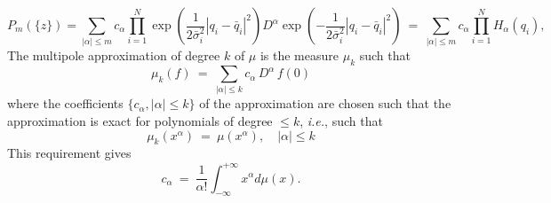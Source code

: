 \documentclass[11pt,a4paper]{article}
\begin{document}
\begin{equation}
    \label{eq:multipole-expansion-polynomial-II}
    P_m(\{{z}\})
    =
    \sum_{|\alpha|\leq m}
    c_\alpha
    \prod_{i=1}^{N} \exp\left(\frac{1}{2\bar{\sigma}_i^2}|{q}_i - \bar{{q}}_i|^2 \right)
    D^\alpha \exp\left(- \frac{1}{2\bar{\sigma}_i^2}|{q}_i - \bar{{q}}_i|^2 \right)\
    =\
    \sum_{|\alpha|\leq m}
    c_\alpha
    \prod_{i=1}^{N} H_\alpha(q_i),
\end{equation}
The multipole approximation of degree $k$ of $\mu$ is the measure $\mu_k$ such that
\begin{equation}
 \label{eq:multipole-approximation}
\mu_k(f)\ =\ \sum_{|\alpha| \leq k} c_{\alpha} \, D^{\alpha} \, f(0)
\end{equation}
where the coefficients $\{c_{\alpha},  |\alpha| \leq k \}$ of the approximation are chosen such that the approximation is exact for polynomials of degree $\leq k$,  {\it i.e.},  such that
\begin{equation}
\mu_k (x^{\alpha})\ =\ \mu (x^{\alpha}), \quad |\alpha| \leq k 
\end{equation}
 This requirement gives
 \begin{equation}
 \label{eq:multipole-int-requirement}
 c_{\alpha}\ =\ \frac{1}{\alpha !} \int_{-\infty}^{+\infty}  x^{\alpha} d\mu(x).
 \end{equation}
 
\end{document}
